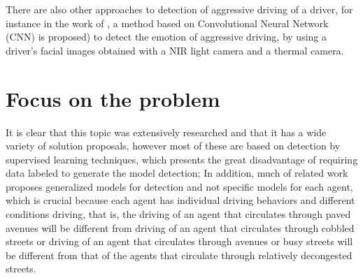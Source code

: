 \vspace{5mm} %

There are also other approaches to detection of aggressive driving of a driver, for instance in the work of , a method based on Convolutional Neural Network (CNN) is proposed) to detect the emotion of aggressive driving, by using a driver's facial images obtained with a NIR light camera and a thermal camera.

\section{Focus on the problem}

It is clear that this topic was extensively researched and that it has a wide variety of solution proposals, however most of these are based on detection by supervised learning techniques, which presents the great disadvantage of requiring data labeled to generate the model detection; In addition, much of related work proposes generalized models for detection and not specific models for each agent, which is crucial because each agent has individual driving behaviors and different conditions driving, that is, the driving of an agent that circulates through paved avenues will be different from driving of an agent that circulates through cobbled streets or driving of an agent that circulates through avenues or busy streets will be different from that of the agents that circulate through relatively decongested streets.

